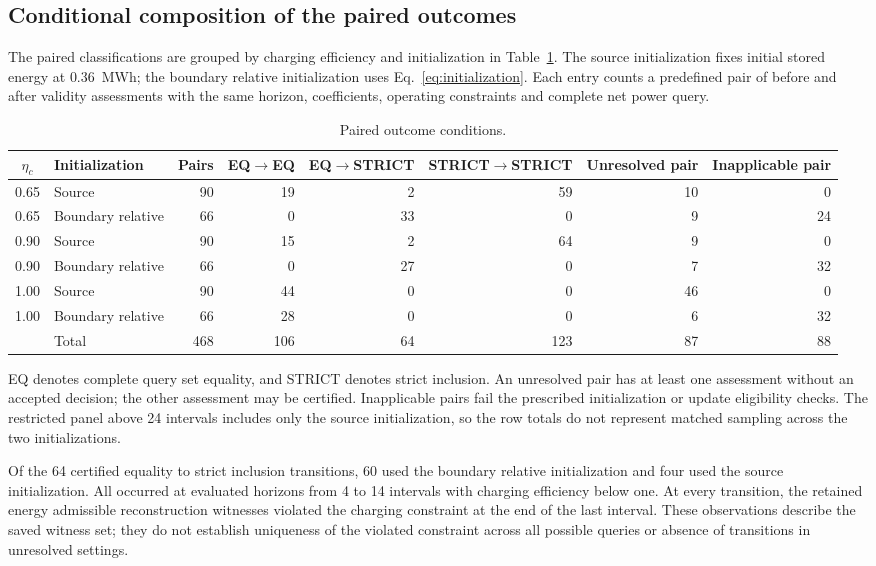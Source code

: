 \subsection{Conditional composition of the paired outcomes}
The paired classifications are grouped by charging efficiency and initialization
in Table~\ref{tab:residual_paired_conditions}. The source initialization fixes
initial stored energy at $0.36$~MWh; the boundary relative initialization uses
Eq.~\eqref{eq:initialization}. Each entry counts
a predefined pair of before and after validity assessments with the same horizon,
coefficients, operating constraints and complete net power query.

\begin{table}[htbp]
\caption{Paired outcome conditions.}\label{tab:residual_paired_conditions}

\begin{tabular}{@{}c l r r r r r r@{}}
\toprule
$\eta_c$ & Initialization & Pairs & EQ$\to$EQ & EQ$\to$STRICT & STRICT$\to$STRICT & Unresolved pair & Inapplicable pair\\
\midrule
0.65 & Source & 90 & 19 & 2 & 59 & 10 & 0 \\
0.65 & Boundary relative & 66 & 0 & 33 & 0 & 9 & 24 \\
0.90 & Source & 90 & 15 & 2 & 64 & 9 & 0 \\
0.90 & Boundary relative & 66 & 0 & 27 & 0 & 7 & 32 \\
1.00 & Source & 90 & 44 & 0 & 0 & 46 & 0 \\
1.00 & Boundary relative & 66 & 28 & 0 & 0 & 6 & 32 \\
\midrule
 & Total & 468 & 106 & 64 & 123 & 87 & 88\\
\bottomrule
\end{tabular}
\par\smallskip
\begin{minipage}{\linewidth}
EQ denotes complete query set equality, and STRICT denotes strict inclusion.
An unresolved pair has at least one assessment without an accepted decision;
the other assessment may be certified. Inapplicable pairs fail the prescribed
initialization or update eligibility checks. The restricted panel above
24 intervals includes only the source initialization, so the row totals do
not represent matched sampling across the two initializations.
\end{minipage}
\end{table}

Of the 64 certified equality to strict inclusion transitions, 60 used the
boundary relative initialization and four used the source initialization.
All occurred at evaluated horizons from 4 to 14 intervals with charging
efficiency below one. At every transition, the retained energy admissible
reconstruction witnesses violated the charging constraint at the end of the
last interval. These observations describe the saved witness set; they do
not establish uniqueness of the violated constraint across all possible
queries or absence of transitions in unresolved settings.

